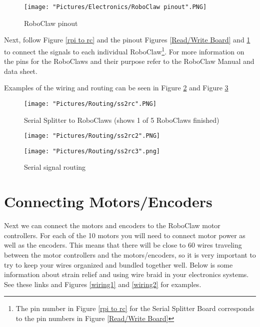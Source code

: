 \documentclass[12pt]{article}
\begin{document}
\begin{figure}[H]
 	\centering
	\texttt{[image: "Pictures/Electronics/RoboClaw pinout".PNG]}
 	\caption{RoboClaw pinout}
	\label{RC pinout}
\end{figure}

Next, follow Figure \ref{rpi to rc} and the pinout Figures \ref{Read/Write Board} and \ref{RC pinout} to connect the signals to each individual RoboClaw\footnote{The pin number in Figure \ref{rpi to rc} for the Serial Splitter Board corresponds to the pin numbers in Figure \ref{Read/Write Board}}. For more information on the pins for the RoboClaws and their purpose refer to the RoboClaw Manual and data sheet. 

\noindent Examples of the wiring and routing can be seen in Figure \ref{ss2rc1} and Figure \ref{ss2rc2}

\begin{figure}[H]
 	\centering
	\texttt{[image: "Pictures/Routing/ss2rc".PNG]}
 	\caption{Serial Splitter to RoboClaws (shows 1 of 5 RoboClaws finished)}
	\label{ss2rc1}
\end{figure}

\begin{figure}[H]
 	\centering
  	\begin{minipage}[b]{0.50\textwidth}
		\texttt{[image: "Pictures/Routing/ss2rc2".PNG]}
  	\end{minipage}
  	\hfill
  	\begin{minipage}[b]{0.40\textwidth}
    		\texttt{[image: "Pictures/Routing/ss2rc3".png]}
  	\end{minipage}
	\caption{Serial signal routing}
	\label{ss2rc2}
\end{figure}

\section{Connecting Motors/Encoders}

Next we can connect the motors and encoders to the RoboClaw motor controllers. For each of the 10 motors you will need to connect motor power as well as the encoders. This means that there will be close to 60 wires traveling between the motor controllers and the motors/encoders, so it is very important to try to keep your wires organized and bundled together well. Below is some information about strain relief and using wire braid in your electronics systems.  See these links and Figures \ref{wiring1} and \ref{wiring2} for examples.
\end{document}
